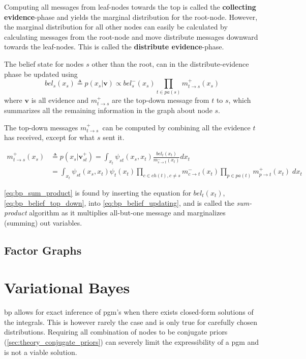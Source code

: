 Computing all messages from leaf-nodes towards the top is called the \textbf{collecting evidence}-phase and yields the marginal distribution for the root-node. However, the marginal distribution for all other nodes can easily be calculated by calculating messages from the root-node and move distribute messages downward towards the leaf-nodes. This is called the \textbf{distribute evidence}-phase. 

The belief state for nodes $s$ other than the root, can in the distribute-evidence phase be updated using
\begin{equation}\label{eq:bp_belief_top_down}
    bel_s(x_s) \triangleq p(x_s | \mathbf{v}) \propto bel_s^-(x_s) \prod_{t \in pa(s)} m_{t \to s}^+(x_s)
\end{equation}
where $\mathbf{v}$ is all evidence and $m_{t \to s}^+$ are the top-down message from $t$ to $s$, which summarizes all the remaining information in the graph about node $s$. 

The top-down messages $m_{t \to s}^+$ can be computed by combining all the evidence $t$ has received, except for what $s$ sent it.

\begin{subequations}
\begin{align}
    m_{t \to s}^+(x_s) &\triangleq p(x_s | \mathbf{v}_{st}^+) = \int_{x_t}\psi_{st}(x_s, x_t)\frac{bel_t(x_t)}{m_{s \to t}^-(x_t)}dx_t \label{eq:bp_belief_updating}\\
    &= \int_{x_t} \psi_{st}(x_s, x_t)\psi_t(x_t) \prod_{c \in ch(t), c \neq s} m_{c \to t}^-(x_t) \prod_{p \in pa(t)} m_{p \to t}^+(x_t) \; dx_t\label{eq:bp_sum_product}
\end{align}
\end{subequations}

\cref{eq:bp_sum_product} is found by inserting the equation for $bel_t(x_t)$, \cref{eq:bp_belief_top_down}, into \cref{eq:bp_belief_updating}, and is called the \textit{sum-product} algorithm as it multiplies all-but-one message and marginalizes (summing) out variables. 







\subsection{Factor Graphs}
\section{Variational Bayes}
\acrshort{bp} allows for exact inference of \acrshort{pgm}'s when there exists closed-form solutions of the integrals. This is however rarely the case and is only true for carefully chosen distributions. Requiring all combination of nodes to be conjugate priors (\cref{sec:theory_conjugate_priors}) can severely limit the expressibility of a \acrshort{pgm} and is not a viable solution. 

